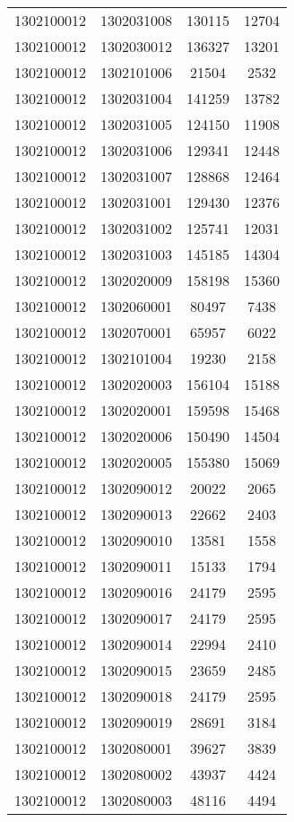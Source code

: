 \begin{longtable}[h]{llcc}
		1302100012 & 1302031008 & 130115 & 12704\\
		1302100012 & 1302030012 & 136327 & 13201\\
		1302100012 & 1302101006 & 21504 & 2532\\
		1302100012 & 1302031004 & 141259 & 13782\\
		1302100012 & 1302031005 & 124150 & 11908\\
		1302100012 & 1302031006 & 129341 & 12448\\
		1302100012 & 1302031007 & 128868 & 12464\\
		1302100012 & 1302031001 & 129430 & 12376\\
		1302100012 & 1302031002 & 125741 & 12031\\
		1302100012 & 1302031003 & 145185 & 14304\\
		1302100012 & 1302020009 & 158198 & 15360\\
		1302100012 & 1302060001 & 80497 & 7438\\
		1302100012 & 1302070001 & 65957 & 6022\\
		1302100012 & 1302101004 & 19230 & 2158\\
		1302100012 & 1302020003 & 156104 & 15188\\
		1302100012 & 1302020001 & 159598 & 15468\\
		1302100012 & 1302020006 & 150490 & 14504\\
		1302100012 & 1302020005 & 155380 & 15069\\
		1302100012 & 1302090012 & 20022 & 2065\\
		1302100012 & 1302090013 & 22662 & 2403\\
		1302100012 & 1302090010 & 13581 & 1558\\
		1302100012 & 1302090011 & 15133 & 1794\\
		1302100012 & 1302090016 & 24179 & 2595\\
		1302100012 & 1302090017 & 24179 & 2595\\
		1302100012 & 1302090014 & 22994 & 2410\\
		1302100012 & 1302090015 & 23659 & 2485\\
		1302100012 & 1302090018 & 24179 & 2595\\
		1302100012 & 1302090019 & 28691 & 3184\\
		1302100012 & 1302080001 & 39627 & 3839\\
		1302100012 & 1302080002 & 43937 & 4424\\
		1302100012 & 1302080003 & 48116 & 4494\\

\end{longtable}
